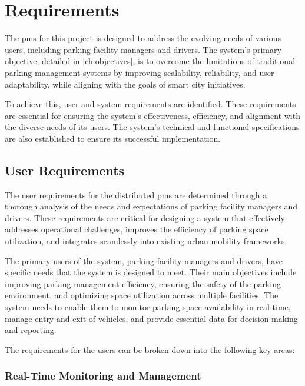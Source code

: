 \chapter{Requirements}\label{ch:requirements}

The \gls{pms} for this project is designed to address the evolving needs of various users, including parking facility managers and drivers. The system's primary objective, detailed in \cref{ch:objectives}, is to overcome the limitations of traditional parking management systems by improving scalability, reliability, and user adaptability, while aligning with the goals of smart city initiatives.

To achieve this, user and system requirements are identified. These requirements are essential for ensuring the system’s effectiveness, efficiency, and alignment with the diverse needs of its users. The system's technical and functional specifications are also established to ensure its successful implementation.

\section{User Requirements}\label{sec:user_requirements}

The user requirements for the distributed \gls{pms} are determined through a thorough analysis of the needs and expectations of parking facility managers and drivers. These requirements are critical for designing a system that effectively addresses operational challenges, improves the efficiency of parking space utilization, and integrates seamlessly into existing urban mobility frameworks.

The primary users of the system, parking facility managers and drivers, have specific needs that the system is designed to meet. Their main objectives include improving parking management efficiency, ensuring the safety of the parking environment, and optimizing space utilization across multiple facilities. The system needs to enable them to monitor parking space availability in real-time, manage entry and exit of vehicles, and provide essential data for decision-making and reporting.

The requirements for the users can be broken down into the following key areas:

\subsection{Real-Time Monitoring and Management}

